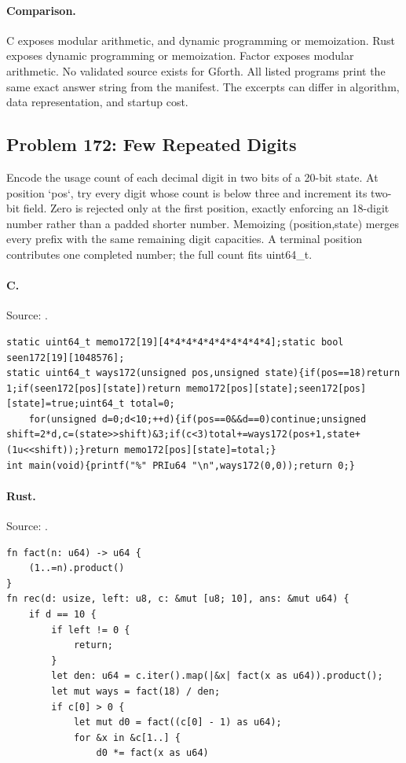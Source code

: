 \paragraph{Comparison.}
C exposes modular arithmetic, and dynamic programming or memoization. Rust exposes dynamic programming or memoization. Factor exposes modular arithmetic.
No validated source exists for Gforth.
All listed programs print the same exact answer string from the manifest. The excerpts can differ in algorithm, data representation, and startup cost.

\subsection{Problem 172: Few Repeated Digits}
\label{walkthrough:p172}
Encode the usage count of each decimal digit in two bits of a 20-bit state. At position `pos`, try every digit whose count is below three and increment its two-bit field. Zero is rejected only at the first position, exactly enforcing an 18-digit number rather than a padded shorter number. Memoizing (position,state) merges every prefix with the same remaining digit capacities. A terminal position contributes one completed number; the full count fits uint64\_t.

\paragraph{C.} Source: .
\begin{lstlisting}
static uint64_t memo172[19][4*4*4*4*4*4*4*4*4*4];static bool seen172[19][1048576];
static uint64_t ways172(unsigned pos,unsigned state){if(pos==18)return 1;if(seen172[pos][state])return memo172[pos][state];seen172[pos][state]=true;uint64_t total=0;
    for(unsigned d=0;d<10;++d){if(pos==0&&d==0)continue;unsigned shift=2*d,c=(state>>shift)&3;if(c<3)total+=ways172(pos+1,state+(1u<<shift));}return memo172[pos][state]=total;}
int main(void){printf("%" PRIu64 "\n",ways172(0,0));return 0;}
\end{lstlisting}

\paragraph{Rust.} Source: .
\begin{lstlisting}
fn fact(n: u64) -> u64 {
    (1..=n).product()
}
fn rec(d: usize, left: u8, c: &mut [u8; 10], ans: &mut u64) {
    if d == 10 {
        if left != 0 {
            return;
        }
        let den: u64 = c.iter().map(|&x| fact(x as u64)).product();
        let mut ways = fact(18) / den;
        if c[0] > 0 {
            let mut d0 = fact((c[0] - 1) as u64);
            for &x in &c[1..] {
                d0 *= fact(x as u64)
\end{lstlisting}

